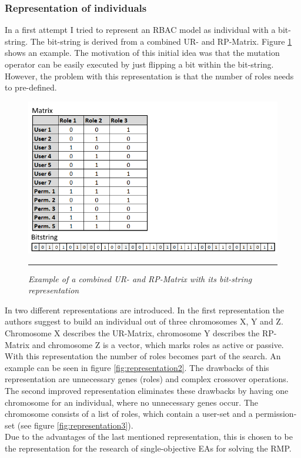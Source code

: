     \subsubsection{Representation of individuals}
    In a first attempt I tried to represent an RBAC model as individual with a bit-string. The bit-string is derived from a combined UR- and RP-Matrix. Figure \ref{fig:representation1} shows an example. The motivation of this initial idea was that the mutation operator can be easily executed by just flipping a bit within the bit-string. However, the problem with this representation is that the number of roles needs to pre-defined.\\
    \begin{figure}[H]
        \centering
        \includegraphics[scale=0.75]{./Figures/Representation1.png}
        \rule{20em}{0.5pt}
        \caption{\textit{Example of a combined UR- and RP-Matrix with its bit-string representation}}
        \label{fig:representation1}
    \end{figure}
    In \cite{saenko2012design} two different representations are introduced. In the first representation the authors suggest to build an individual out of three chromosomes X, Y and Z. Chromosome X describes the UR-Matrix, chromosome Y describes the RP-Matrix and chromosome Z is a vector, which marks roles as active or passive. With this representation the number of roles becomes part of the search. An example can be seen in figure \ref{fig:representation2}. The drawbacks of this representation are unnecessary genes (roles) and complex crossover operations\cite{saenko2012design}. The second improved representation eliminates these drawbacks by having one chromosome for an individual, where no unnecessary genes occur. The chromosome consists of a list of roles, which contain a user-set and a permission-set (see figure \ref{fig:representation3}).\\
    Due to the advantages of the last mentioned representation, this is chosen to be the representation for the research of single-objective EAs for solving the RMP.\\
    
